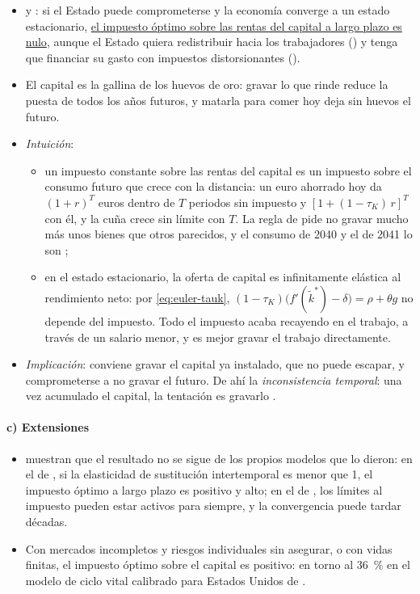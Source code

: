 \documentclass[11pt]{article}
\begin{document}
\begin{itemize}
\item \textcite{Judd1985Redistributive} y \textcite{Chamley1986Optimal}: si el Estado puede comprometerse y la economía converge a un estado estacionario, \uline{el impuesto óptimo sobre las rentas del capital a largo plazo es nulo}, aunque el Estado quiera redistribuir hacia los trabajadores () y tenga que financiar su gasto con impuestos distorsionantes ().
\item El capital es la gallina de los huevos de oro: gravar lo que rinde reduce la puesta de todos los años futuros, y matarla para comer hoy deja sin huevos el futuro.
\item \emph{Intuición}:
  \begin{itemize}
  \item un impuesto constante sobre las rentas del capital es un impuesto sobre el consumo futuro que crece con la distancia: un euro ahorrado hoy da $(1+r)^T$ euros dentro de $T$ periodos sin impuesto y $[1+(1-\tau_K)\,r]^T$ con él, y la cuña crece sin límite con $T$\nocite{AtkesonChariKehoe1999Taxing}. La regla de  pide no gravar mucho más unos bienes que otros parecidos, y el consumo de 2040 y el de 2041 lo son ;
  \item en el estado estacionario, la oferta de capital es infinitamente elástica al rendimiento neto: por \eqref{eq:euler-tauk}, $(1-\tau_K)\big(f'(\tilde k^*)-\delta\big)=\rho+\theta g$ no depende del impuesto. Todo el impuesto acaba recayendo en el trabajo, a través de un salario menor, y es mejor gravar el trabajo directamente.
  \end{itemize}
\item \emph{Implicación}: conviene gravar el capital ya instalado, que no puede escapar, y comprometerse a no gravar el futuro. De ahí la \emph{inconsistencia temporal}: una vez acumulado el capital, la tentación es gravarlo .
\end{itemize}

\paragraph{c) Extensiones}

\begin{itemize}
\item \textcite{StraubWerning2020Positive} muestran que el resultado no se sigue de los propios modelos que lo dieron: en el de , si la elasticidad de sustitución intertemporal es menor que 1, el impuesto óptimo a largo plazo es positivo y alto; en el de , los límites al impuesto pueden estar activos para siempre, y la convergencia puede tardar décadas.
\item Con mercados incompletos y riesgos individuales sin asegurar\nocite{Aiyagari1995Optimal}, o con vidas finitas, el impuesto óptimo sobre el capital es positivo: en torno al 36~\% en el modelo de ciclo vital calibrado para Estados Unidos de \textcite{ConesaKitaoKrueger2009Taxing}.
\end{itemize}
\end{document}
